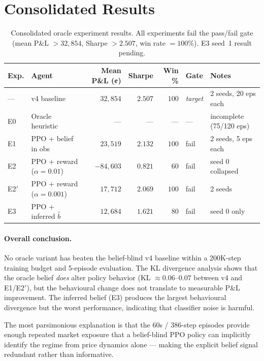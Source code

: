 \documentclass[11pt]{article}
\begin{document}
\section{Consolidated Results}

\begin{table}[H]
\centering
\begin{tabular}{llrrrll}
\toprule
\textbf{Exp.} &
\textbf{Agent} &
\textbf{Mean P\&L (¢)} &
\textbf{Sharpe} &
\textbf{Win \%} &
\textbf{Gate} &
\textbf{Notes} \\
\midrule
--- & v4 baseline & $32{,}854$ & $2.507$ & $100$ & \textit{target} & 2 seeds, 20 eps each \\
\midrule
E0  & Oracle heuristic & --- & --- & --- & --- & incomplete (75/120 eps) \\
E1  & PPO + belief in obs & $23{,}519$ & $2.132$ & $100$ & fail & 2 seeds, 5 eps each \\
E2  & PPO + reward ($\alpha=0.01$) & $-84{,}603$ & $0.821$ & $60$ & fail & seed 0 collapsed \\
E2$'$ & PPO + reward ($\alpha=0.001$) & $17{,}712$ & $2.069$ & $100$ & fail & 2 seeds \\
E3  & PPO + inferred $\hat{b}$ & $12{,}684$ & $1.621$ & $80$ & fail & seed 0 only \\
\bottomrule
\end{tabular}
\caption{Consolidated oracle experiment results.
         All experiments fail the pass/fail gate (mean P\&L $>32{,}854$,
         Sharpe $>2.507$, win rate $=100\%$).
         E3 seed~1 result pending.}
\label{tab:consolidated}
\end{table}

\paragraph{Overall conclusion.}
No oracle variant has beaten the belief-blind v4 baseline within a
200K-step training budget and 5-episode evaluation.
The KL divergence analysis shows that the oracle belief \emph{does}
alter policy behavior (KL $\approx 0.06$--$0.07$ between v4 and E1/E2$'$),
but the behavioural change does not translate to measurable P\&L improvement.
The inferred belief (E3) produces the largest behavioural divergence but the
worst performance, indicating that classifier noise is harmful.

The most parsimonious explanation is that the 60s / 386-step episodes
provide enough repeated market exposure that a belief-blind PPO policy
can implicitly identify the regime from price dynamics alone --- making
the explicit belief signal redundant rather than informative.
\end{document}
